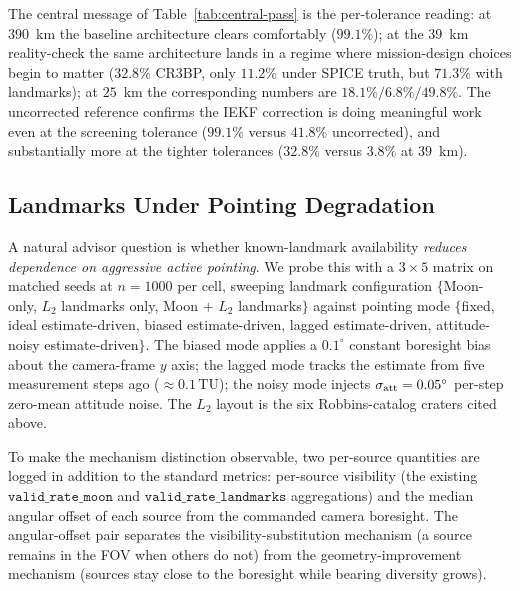 \documentclass[10pt,twocolumn]{article}
\newcommand{\TU}{\mathrm{TU}}
\begin{document}
The central message of Table~\ref{tab:central-pass} is the per-tolerance reading: at $390$~km the baseline architecture clears comfortably ($99.1\%$); at the $39$~km reality-check the same architecture lands in a regime where mission-design choices begin to matter ($32.8\%$ CR3BP, only $11.2\%$ under SPICE truth, but $71.3\%$ with landmarks); at $25$~km the corresponding numbers are $18.1\%/6.8\%/49.8\%$.  The uncorrected reference confirms the IEKF correction is doing meaningful work even at the screening tolerance ($99.1\%$ versus $41.8\%$ uncorrected), and substantially more at the tighter tolerances ($32.8\%$ versus $3.8\%$ at $39$~km).

\subsection{Landmarks Under Pointing Degradation}
\label{sec:landmarks-pointing}
A natural advisor question is whether known-landmark availability \emph{reduces dependence on aggressive active pointing}.  We probe this with a $3\times 5$ matrix on matched seeds at $n=1000$ per cell, sweeping landmark configuration $\{$Moon-only, $L_2$ landmarks only, Moon $+$ $L_2$ landmarks$\}$ against pointing mode $\{$fixed, ideal estimate-driven, biased estimate-driven, lagged estimate-driven, attitude-noisy estimate-driven$\}$.  The biased mode applies a $0.1^{\circ}$ constant boresight bias about the camera-frame $y$ axis; the lagged mode tracks the estimate from five measurement steps ago ($\approx 0.1\,\TU$); the noisy mode injects $\sigma_{\rm att}=0.05^{\circ}$ per-step zero-mean attitude noise.  The $L_2$ layout is the six Robbins-catalog craters cited above.

To make the mechanism distinction observable, two per-source quantities are logged in addition to the standard metrics: per-source visibility (the existing $\texttt{valid\_rate\_moon}$ and $\texttt{valid\_rate\_landmarks}$ aggregations) and the median angular offset of each source from the commanded camera boresight.  The angular-offset pair separates the visibility-substitution mechanism (a source remains in the FOV when others do not) from the geometry-improvement mechanism (sources stay close to the boresight while bearing diversity grows).
\end{document}
